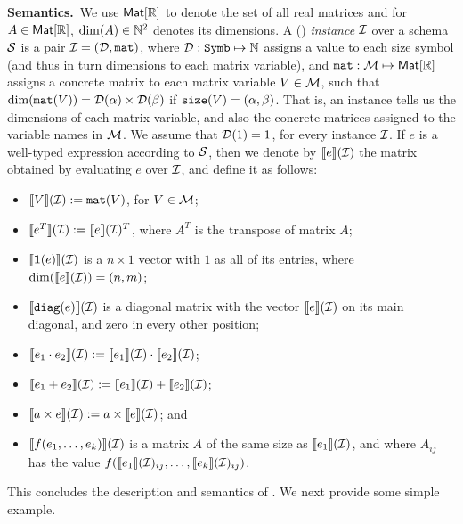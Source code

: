 \smallskip
\noindent
\textbf{Semantics.}\, We use $\textsf{Mat}[\mathbb{R}]$ to denote the set of all real matrices and for 
$A\in\textsf{Mat}[\mathbb{R}]$, $\dim(A)\in\mathbb{N}^2$ denotes its dimensions.
A (\lang) \textit{instance} $\mathcal{I}$ over a schema $\mathcal{S}$ is a pair $\mathcal{I} = (\mathcal{D},\texttt{mat})$, where $\mathcal{D} : \texttt{Symb} \mapsto \mathbb{N}$ assigns a value to each size symbol (and thus in turn  dimensions to each matrix variable), and $\texttt{mat} : \mathcal{M} \mapsto \textsf{Mat}[\mathbb{R}]$ assigns a concrete matrix to each matrix variable $V\in \mathcal{M}$, such that $\dim(\texttt{mat}(V)) = \mathcal{D}(\alpha)\times \mathcal{D}(\beta)$ if $\texttt{size}(V) = (\alpha,\beta)$. That is, an instance tells us the dimensions of each matrix variable, and also the concrete matrices assigned to the variable names in $\mathcal{M}$. We assume that $\mathcal{D}(1) = 1$, for every instance $\mathcal{I}$. If $e$ is a well-typed expression according to $\mathcal{S}$, then we denote by $\llbracket e \rrbracket(\mathcal{I})$ the matrix obtained by evaluating $e$ over $\mathcal{I}$, and define it as follows:
\begin{itemize}
\item $\llbracket V \rrbracket(\mathcal{I}) := \texttt{mat}(V)$, for $V\in \mathcal{M}$;
\item $\llbracket e^T \rrbracket(\mathcal{I}) := \llbracket e \rrbracket(\mathcal{I})^T$, where $A^T$ is the transpose of matrix $A$;
\item $\llbracket \mathbf{1}(e) \rrbracket(\mathcal{I})$ is a $n\times 1$ vector with $1$ as all of its entries, where $\dim(\llbracket e \rrbracket(\mathcal{I}))=(n,m)$;
\item $\llbracket \texttt{diag}(e) \rrbracket(\mathcal{I})$ is a diagonal matrix with the vector $\llbracket e \rrbracket(\mathcal{I})$ on its main diagonal, and zero in every other position;
\item $\llbracket e_1\cdot e_2 \rrbracket(\mathcal{I}) := \llbracket e_1 \rrbracket(\mathcal{I}) \cdot \llbracket e_2 \rrbracket(\mathcal{I})$;
\item $\llbracket e_1+ e_2 \rrbracket(\mathcal{I}) := \llbracket e_1 \rrbracket(\mathcal{I}) + \llbracket e_2 \rrbracket(\mathcal{I})$;
\item $\llbracket a\times e \rrbracket(\mathcal{I}) := a\times \llbracket e \rrbracket(\mathcal{I})$; and
\item $\llbracket f(e_1,\ldots ,e_k) \rrbracket(\mathcal{I})$ is a matrix $A$ of the same size as $\llbracket e_1 \rrbracket(\mathcal{I})$, and where $A_{ij}$ has the value $f(\llbracket e_1 \rrbracket(\mathcal{I})_{ij},\ldots ,\llbracket e_k \rrbracket(\mathcal{I})_{ij})$.
\end{itemize}
This concludes the description and semantics of \lang. We next provide some simple example.

